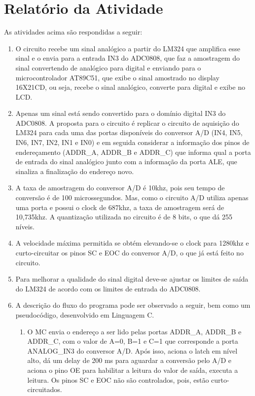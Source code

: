 \documentclass[
	12pt,				%
	openright,			%
  oneside,     %
	a4paper,			%
	english,			%
	french,				%
	spanish,			%
	brazil				%
	]{abntex2}
\begin{document}
\section{Relatório da Atividade} %
\label{sec:consideracoes-cap-1}

\noindent As atividades acima são respondidas a seguir:

\begin{enumerate}
  \item O circuito recebe um sinal analógico a partir do LM324 que amplifica esse sinal e o envia para a entrada IN3 do ADC0808, que faz a amostragem do sinal convertendo de analógico para digital e enviando para o microcontrolador AT89C51, que exibe o sinal amostrado no display 16X21CD, ou seja, recebe o sinal analógico, converte para digital e exibe no LCD.
  \item Apenas um sinal está sendo convertido para o domínio digital IN3 do ADC0808. A proposta para o circuito é replicar o circuito de aquisição do LM324 para cada uma das portas disponíveis do conversor A/D (IN4, IN5, IN6, IN7, IN2, IN1 e IN0) e em seguida considerar a informação dos pinos de endereçamento (ADDR\_A, ADDR\_B e ADDR\_C) que informa qual a porta de entrada do sinal analógico junto com a informação da porta ALE, que sinaliza a finalização do endereço novo.
  \item A taxa de amostragem do conversor A/D é 10khz, pois seu tempo de conversão é de 100 microssegundos. Mas, como o circuito A/D utiliza apenas uma porta e possui o clock de 687khz, a taxa de amostragem será de 10,735khz. A quantização utilizada no circuito é de 8 bits, o que dá 255 níveis.
  \item A velocidade máxima permitida se obtém elevando-se o clock para 1280khz e curto-circuitar os pinos SC e EOC do conversor A/D, o que já está feito no circuito.
  \item Para melhorar a qualidade do sinal digital deve-se ajustar os limites de saída do LM324 de acordo com os limites de entrada do ADC0808.
  \item A descrição do fluxo do programa pode ser observado a seguir, bem como um pseudocódigo, desenvolvido em Linguagem C.
  \begin{enumerate}
    \item O MC envia o endereço a ser lido pelas portas  ADDR\_A, ADDR\_B e ADDR\_C, com o valor de A=0, B=1 e C=1 que corresponde a porta ANALOG\_IN3 do conversor A/D. Após isso, aciona o latch em nível alto, dá um delay de 200 ms  para aguardar a conversão pelo A/D e aciona o pino OE para habilitar a leitura do valor de saída, executa a leitura. Os pinos SC e EOC não são controlados, pois, estão curto-circuitados.

\end{enumerate}
\end{enumerate}
\end{document}
